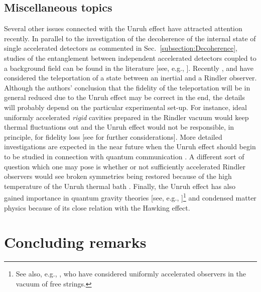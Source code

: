 \documentclass[12pt,nofootinbib,floatfix,aps,prd,showpacs,amsmath,amssymb,eqsecnum]{revtex4-2}
\begin{document}
\subsection{Miscellaneous topics}
\label{subsection:Miscellaneous}

Several other issues connected with the Unruh effect have attracted 
attention recently. In parallel to the investigation of the 
decoherence of the internal state of single accelerated detectors 
as commented in Sec.~\ref{subsection:Decoherence}, studies of the 
entanglement between independent accelerated detectors coupled 
to a background field can  be found in the literature 
[see, e.g., \textcite{Pringle89,Benattital04,Rezniktal05, Massaretal06}]. 
Recently \textcite{Alsingetal03}, 
\textcite{Alsingetal04} and \textcite{Alsingetal06} 
have considered the teleportation of a state between an inertial and a 
Rindler observer. 
Although the authors' conclusion that the fidelity of the 
teleportation will be in general reduced due to the Unruh effect 
may be correct in the end, 
the details will probably depend 
on the particular experimental set-up. For instance, ideal uniformly 
accelerated {\em rigid} cavities prepared in the Rindler vacuum  would keep 
thermal fluctuations out \cite{Levinetal92} and the Unruh effect 
would not be responsible, in principle, for fidelity loss 
[see \textcite{Schutzholdetal05} for further considerations]. 
More detailed investigations are expected in the near future when
the Unruh effect should begin to be studied in connection with 
quantum communication \cite{Bradler07}. A different sort of question 
which one may pose is whether or not sufficiently accelerated Rindler 
observers would see broken symmetries being restored because of the 
high temperature of the Unruh thermal bath \cite{Hill85,Ohsaku04,Ebertetal07,Kharzeevetal05}. 
Finally, the Unruh effect has also gained importance in
quantum gravity theories [see, e.g., 
\textcite{Susskindetal94}]\footnote{See also, e.g., 
\textcite{Parentanietal89}, who have considered uniformly 
accelerated observers in the vacuum of free strings.}
and condensed matter physics \cite{Unruh81} because of 
its close relation with the Hawking effect.

\section{Concluding remarks}
\label{section:Summary}
\end{document}
